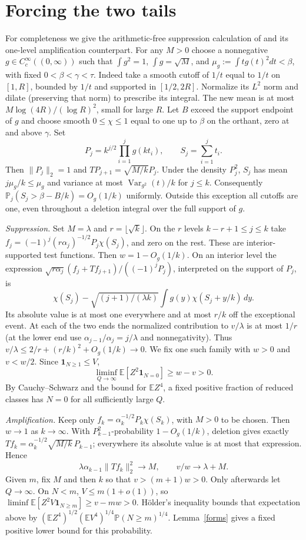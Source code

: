 \documentclass[11pt]{article}
\newcommand{\E}{\mathbb E}
\newcommand{\PP}{\mathbb P}
\newcommand{\ind}{\mathbf 1}
\begin{document}
\section{Forcing the two tails}
For completeness we give the arithmetic-free suppression calculation of
\cite[Prop.~4.2]{OAI} and its one-level amplification counterpart.
For any $M>0$ choose a nonnegative $g\in C_c^\infty((0,\infty))$
such that $\int g^2=1$, $\int g=\sqrt M$, and
$\mu_g:=\int t g(t)^2dt<\beta$, with fixed $0<\beta<\gamma<\tau$.
Indeed take a smooth cutoff of $1/t$ equal to $1/t$ on $[1,R]$,
bounded by $1/t$ and supported in $[1/2,2R]$. Normalize its $L^2$
norm and dilate (preserving that norm) to prescribe its integral.
The new mean is at most $M\log(4R)/(\log R)^2$, small for large $R$.
Let $B$ exceed the support endpoint of $g$ and choose smooth $0\le\chi\le1$
equal to one up to $\beta$ on the orthant, zero at and above $\gamma$.
Set
\[
 P_j=k^{j/2}\prod_{i=1}^j g(kt_i),\qquad S_j=\sum_{i=1}^jt_i .
\]
Then $\|P_j\|_2=1$ and $TP_{j+1}=\sqrt{M/k}P_j$.
Under the density $P_j^2$, $S_j$ has mean $j\mu_g/k\le\mu_g$
and variance at most $\operatorname{Var}_{g^2}(t)/k$ for $j\le k$.
Consequently $\PP_j(S_j>\beta-B/k)=O_g(1/k)$ uniformly. Outside this
exception all cutoffs are one, even throughout a deletion integral
over the full support of $g$.

\emph{Suppression.} Set $M=\lambda$ and $r=\lfloor\sqrt k\rfloor$.
On the $r$ levels $k-r+1\le j\le k$ take
$f_j=(-1)^j(r\alpha_j)^{-1/2}P_j\chi(S_j)$, and zero on the rest.
These are interior-supported test functions. Then
$w=1-O_g(1/k)$. On an interior level the expression
$\sqrt{r\alpha_j}(f_j+Tf_{j+1})/((-1)^jP_j)$, interpreted on the
support of $P_j$, is
\[
 \chi(S_j)-\sqrt{(j+1)/(\lambda k)}
          \int g(y)\chi(S_j+y/k)\,dy .
\]
Its absolute value is at most one everywhere and at most $r/k$ off
the exceptional event. At each of the two ends the normalized
contribution to $v/\lambda$ is at most $1/r$ (at the lower end use
$\alpha_{j-1}/\alpha_j=j/\lambda$ and nonnegativity).
Thus $v/\lambda\le 2/r+(r/k)^2+O_g(1/k)\to0$. We fix one such family
with $w>0$ and $v<w/2$. Since $\ind_{N\ge1}\le V$,
\[
 \liminf_{Q\to\infty}\E[Z^2\ind_{N=0}]\ge w-v>0 .
\]
By Cauchy--Schwarz and the bound for $\E Z^4$, a fixed positive
fraction of reduced classes has $N=0$ for all sufficiently large $Q$.

\emph{Amplification.} Keep only
$f_k=\alpha_k^{-1/2}P_k\chi(S_k)$, with $M>0$ to be chosen.
Then $w\to1$ as $k\to\infty$. With $P_{k-1}^2$-probability
$1-O_g(1/k)$, deletion gives exactly
$Tf_k=\alpha_k^{-1/2}\sqrt{M/k}\,P_{k-1}$; everywhere its absolute
value is at most that expression. Hence
\[
 \lambda\alpha_{k-1}\|Tf_k\|_2^2\longrightarrow M,
 \qquad v/w\longrightarrow \lambda+M.
\]
Given $m$, fix $M$ and then $k$ so that $v>(m+1)w>0$. Only afterwards
let $Q\to\infty$. On $N<m$, $V\le m(1+o(1))$, so
$\liminf\E[Z^2V\ind_{N\ge m}]\ge v-mw>0$.
H\"older's inequality bounds that expectation above by
$(\E Z^4)^{1/2}(\E V^4)^{1/4}\PP(N\ge m)^{1/4}$.
Lemma~\ref{forms} gives a fixed positive lower bound for this probability.
\end{document}
